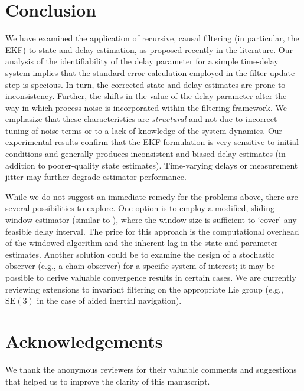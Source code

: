 \documentclass[letterpaper,10pt,conference]{ieeeconf}
\theoremstyle{definition}
\begin{document}
\section{Conclusion}
\label{sec:conclusion}

We have examined the application of recursive, causal filtering (in particular, the EKF) to state and delay estimation, as proposed recently in the literature.
%
Our analysis of the identifiability of the delay parameter for a simple time-delay system implies that the standard error calculation employed in the filter update step is specious.
%
In turn, the corrected state and delay estimates are prone to inconsistency.
%
Further, the shifts in the value of the delay parameter alter the way in which process noise is incorporated within the filtering framework.
%
We emphasize that these characteristics are \emph{structural} and not due to incorrect tuning of noise terms or to a lack of knowledge of the system dynamics.
%
Our experimental results confirm that the EKF formulation is very sensitive to initial conditions and generally produces inconsistent and biased delay estimates (in addition to poorer-quality state estimates).
%
Time-varying delays or measurement jitter may further degrade estimator performance.

While we do not suggest an immediate remedy for the problems above, there are several possibilities to explore.
%
One option is to employ a modified, sliding-window estimator (similar to \cite{2018_Qin_Online}), where the window size is sufficient to `cover' any feasible delay interval.
%
The price for this approach is the computational overhead of the windowed algorithm and the inherent lag in the state and parameter estimates.
%
Another solution could be to examine the design of a stochastic observer (e.g., a chain observer) for a specific system of interest;
%
it may be possible to derive valuable convergence results in certain cases. We are currently reviewing extensions to invariant filtering on the appropriate Lie group (e.g., $\mathrm{SE}(3)$ in the case of aided inertial navigation).

\section*{Acknowledgements}
\label{sec:ack}

We thank the anonymous reviewers for their valuable comments and suggestions that helped us to improve the clarity of this manuscript.



\end{document}
